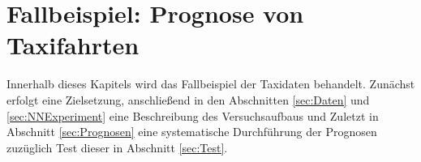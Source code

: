 \chapter{Fallbeispiel: Prognose von Taxifahrten}
\label{cha:Taxis} \label{cha:Experiment}
Innerhalb dieses Kapitels wird das Fallbeispiel der Taxidaten behandelt. Zunächst erfolgt eine Zielsetzung, anschließend in den Abschnitten \ref{sec:Daten} und \ref{sec:NNExperiment} eine Beschreibung des Versuchsaufbaus und Zuletzt in Abschnitt \ref{sec:Prognosen} eine systematische Durchführung der Prognosen zuzüglich Test dieser in Abschnitt \ref{sec:Test}. 






